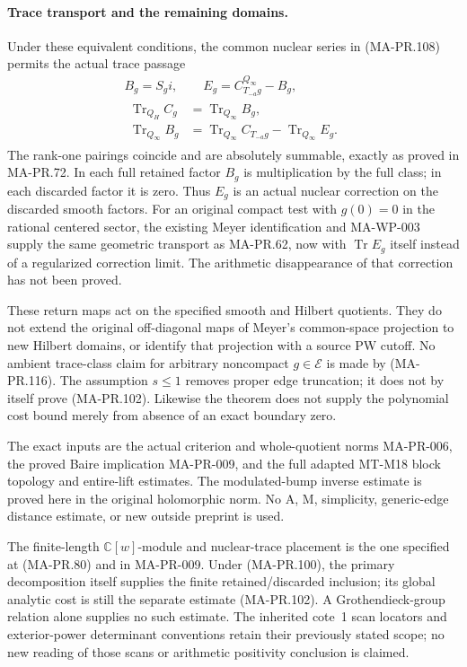 \paragraph{Trace transport and the remaining domains.}
Under these equivalent conditions, the common nuclear
series in (MA-PR.108) permits the actual trace passage
\[
 \begin{gathered}
 B_g=S_g i,\qquad E_g=C_{T_{-a}g}^{Q_\infty}-B_g,\\
 \begin{aligned}
 \operatorname{Tr}_{Q_H}C_g
   &=\operatorname{Tr}_{Q_\infty}B_g,\\
 \operatorname{Tr}_{Q_\infty}B_g
   &=\operatorname{Tr}_{Q_\infty}C_{T_{-a}g}
                         -\operatorname{Tr}_{Q_\infty}E_g .
 \end{aligned}
 \end{gathered}
 \tag{MA-PR.116}
\]
The rank-one pairings coincide and are absolutely
summable, exactly as proved in MA-PR.72.
In each full retained factor \(B_g\) is multiplication
by the full class; in each discarded factor it is zero.
Thus \(E_g\) is an actual nuclear correction on the
discarded smooth factors.  For an original compact
test with \(g(0)=0\) in the rational centered sector, the existing
Meyer identification and MA-WP-003 supply the same
geometric transport as MA-PR.62, now with
\(\operatorname{Tr}E_g\) itself instead of a
regularized correction limit.
The arithmetic disappearance of that correction
has not been proved.

These return maps act on the specified smooth and
Hilbert quotients.  They do not extend the original
off-diagonal maps of Meyer's common-space projection
to new Hilbert domains, or identify that projection
with a source PW cutoff.  No ambient trace-class
claim for arbitrary noncompact \(g\in\mathcal E\)
is made by (MA-PR.116).
The assumption \(s\le1\) removes proper edge
truncation; it does not by itself prove
(MA-PR.102).  Likewise the theorem does not supply
the polynomial cost bound merely from absence of
an exact boundary zero.

The exact inputs are the actual criterion and
whole-quotient norms MA-PR-006, the proved Baire
implication MA-PR-009, and the full adapted
MT-M18 block topology and entire-lift estimates.
The modulated-bump inverse estimate is proved here
in the original holomorphic norm.  No A, M,
simplicity, generic-edge distance estimate, or
new outside preprint is used.

The finite-length \(\mathbb C[w]\)-module and nuclear-trace
placement is the one specified at (MA-PR.80) and in
MA-PR-009.  Under (MA-PR.100), the primary decomposition
itself supplies the finite retained/discarded inclusion;
its global analytic cost is still the separate estimate
(MA-PR.102).  A Grothendieck-group relation alone supplies
no such estimate.  The inherited cote~1 scan locators
and exterior-power determinant conventions retain their
previously stated scope; no new reading of those scans
or arithmetic positivity conclusion is claimed.
